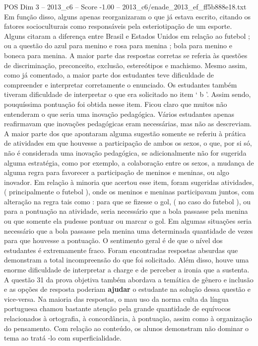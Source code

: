 \begin{textsample}{POS Dim 3 – 2013\_c6 – Score -1.00 – 2013\_c6/enade\_2013\_ef\_ff5b888e18.txt}
Em função disso, alguns apenas reorganizaram o que já estava escrito, citando os fatores socioculturais como responsáveis pela esteriotipação de um esporte.
Alguns citaram a diferença entre Brasil e Estados Unidos em relação ao futebol ; ou a questão do azul para menino e rosa para menina ; bola para menino e boneca para menina.
A maior parte das respostas corretas se referia às questões de discriminação, preconceito, exclusão, estereótipos e machismo.
Mesmo assim, como já comentado, a maior parte dos estudantes teve dificuldade de compreender e interpretar corretamente o enunciado.
Os estudantes também tiveram dificuldade de interpretar o que era solicitado no item ‘ b ’.
Assim sendo, pouquíssima pontuação foi obtida nesse item.
Ficou claro que muitos não entenderam o que seria uma inovação pedagógica.
Vários estudantes apenas reafirmavam que inovações pedagógicas eram necessárias, mas não as descreviam.
A maior parte dos que apontaram alguma sugestão somente se referiu à prática de atividades em que houvesse a participação de ambos os sexos, o que, por si só, não é considerada uma inovação pedagógica, se adicionalmente não for sugerida alguma estratégia, como por exemplo, a colaboração entre os sexos, a mudança de alguma regra para favorecer a participação de meninos e meninas, ou algo inovador.
Em relação à minoria que acertou esse item, foram sugeridas atividades, ( principalmente o futebol ), onde os meninos e meninas participavam juntos, com alteração na regra tais como : para que se fizesse o gol, ( no caso do futebol ), ou para a pontuação na atividade, seria necessário que a bola passasse pela menina ou que somente ela pudesse pontuar ou marcar o gol.
Em algumas situações seria necessário que a bola passasse pela menina uma determinada quantidade de vezes para que houvesse a pontuação.
O sentimento geral é de que o nível dos estudantes é extremamente fraco.
Foram encontradas respostas absurdas que demonstram a total incompreensão do que foi solicitado.
Além disso, houve uma enorme dificuldade de interpretar a charge e de perceber a ironia que a sustenta.
A questão 31 da prova objetiva também abordava a temática de gênero e inclusão e as opções de resposta poderiam \textbf{ajudar} o estudante na solução dessa questão e vice-versa.
Na maioria das respostas, o mau uso da norma culta da língua portuguesa chamou bastante atenção pela grande quantidade de equívocos relacionados à ortografia, à concordância, à pontuação, assim como à organização do pensamento.
Com relação ao conteúdo, os alunos demonstram não dominar o tema ao tratá -lo com superficialidade.

\end{textsample}
